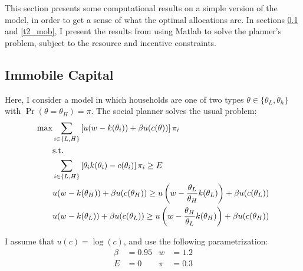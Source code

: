\documentclass[11pt]{article}
\begin{document}
This section presents some computational results on a simple version of the model, in order to get a sense of what the optimal allocations are. In sections \ref{t2_imm} and \ref{t2_mob}, I present the results from using Matlab to solve the planner's problem, subject to the resource and incentive constraints. 

\subsection{Immobile Capital} \label{t2_imm}
Here, I consider a model in which households are one of two types \( \theta\in\{\theta_L, \theta_h\} \) with \( \Pr(\theta = \theta_H) = \pi \). The social planner solves the usual problem:
\begin{align}
    \max &\sum_{i \in\{L,H\}}\left[ u(w - k(\theta_i)) + \beta u(c(\theta)) \right]\pi_i \\ 
    &\text{s.t.} \notag \\
    &\sum_{i \in\{L,H\}}\left[ \theta_i k(\theta_i) - c(\theta_i) \right]\pi_i \ge E \\
    &u(w - k(\theta_H)) + \beta u(c(\theta_H)) \ge u\left( w - \frac{\theta_L}{\theta_H}k(\theta_L) \right) + \beta u(c(\theta_L)) \label{ic_H} \\
    &u(w - k(\theta_L)) + \beta u(c(\theta_L)) \ge u\left( w - \frac{\theta_H}{\theta_L}k(\theta_H) \right) + \beta u(c(\theta_H)) 
\end{align}

I assume that \( u(c) = \log(c) \), and use the following parametrization:
\begin{align*}
    \beta &= 0.95 & w &= 1.2 \\
    E &= 0 & \pi &= 0.3 
\end{align*}
\end{document}
